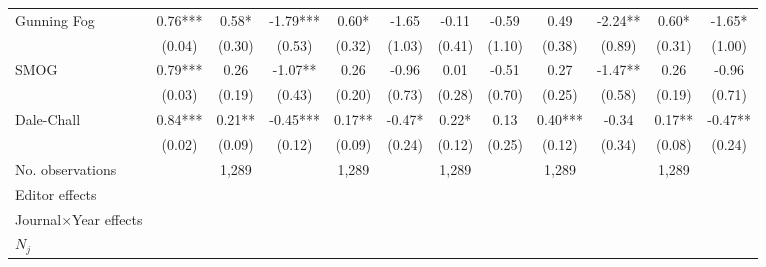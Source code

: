\begin{sidewaystable}
\begin{threeparttable}
\begin{tabular}{p{3cm}S@{}S@{}S@{}S@{}S@{}S@{}S@{}S@{}S@{}S@{}S@{}}
            Gunning Fog                   &        0.76***&        0.58*  &       -1.79***&        0.60*  &       -1.65   &       -0.11   &       -0.59   &        0.49   &       -2.24** &        0.60*  &       -1.65*  \\
                                          &      (0.04)   &      (0.30)   &      (0.53)   &      (0.32)   &      (1.03)   &      (0.41)   &      (1.10)   &      (0.38)   &      (0.89)   &      (0.31)   &      (1.00)   \\
            SMOG                          &        0.79***&        0.26   &       -1.07** &        0.26   &       -0.96   &        0.01   &       -0.51   &        0.27   &       -1.47** &        0.26   &       -0.96   \\
                                          &      (0.03)   &      (0.19)   &      (0.43)   &      (0.20)   &      (0.73)   &      (0.28)   &      (0.70)   &      (0.25)   &      (0.58)   &      (0.19)   &      (0.71)   \\
            Dale-Chall                    &        0.84***&        0.21** &       -0.45***&        0.17** &       -0.47*  &        0.22*  &        0.13   &        0.40***&       -0.34   &        0.17** &       -0.47** \\
                                          &      (0.02)   &      (0.09)   &      (0.12)   &      (0.09)   &      (0.24)   &      (0.12)   &      (0.25)   &      (0.12)   &      (0.34)   &      (0.08)   &      (0.24)   \\
            \midrule
            No. observations              &               &       1,289   &               &       1,289   &               &       1,289   &               &       1,289   &               &       1,289   &               \\
            \midrule
            Editor effects       &               &           {}   &               &           {}   &               &           {}   &               &           {}   &               &               &               \\
            Journal\(\times\)Year effects          &               &           {}   &               &           {}   &               &           {}   &               &           {}   &               &               &               \\
            \(N_j\)                       &               &           {}   &               &           {}   &               &           {}   &               &           {}   &               &               &               \\

\end{tabular}
\end{threeparttable}
\end{sidewaystable}
